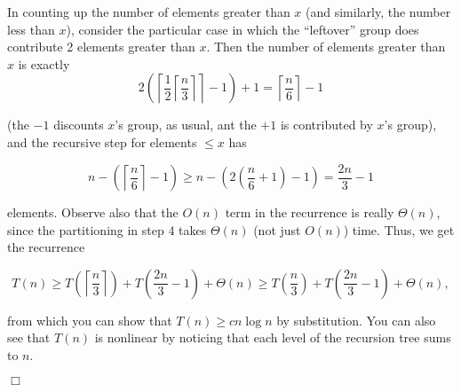 \documentclass[a4paper,10pt]{article}
\newcommand{\qed}{\hfill \ensuremath{\Box}}
\begin{document}
In counting up the number of elements greater than $x$ (and similarly, the number less than $x$), consider
the particular case in which the ``leftover'' group does contribute 2 elements greater than $x$. Then the
number of elements greater than $x$ is exactly
$$2\left(\left\lceil\frac{1}{2}\left\lceil\frac{n}{3}\right\rceil\right\rceil-1\right) + 1 
= \left\lceil\frac{n}{6}\right\rceil -1$$ 

(the $-1$ discounts $x$'s group, as usual, ant the $+1$ is contributed by $x$'s group), 
and the recursive step for elements $\leq x$ has

$$n -\left(\left\lceil\frac{n}{6}\right\rceil  -1\right) \geq n - \left(2\left(\frac{n}{6} + 1\right) - 1\right)
= \frac{2n}{3} - 1$$

 elements. Observe also that the $O(n)$ term in the recurrence is really $\Theta(n)$,
since the partitioning in step 4 takes $\Theta(n)$ (not just $O(n)$) time. Thus, we get the recurrence


$$T(n)\geq T\left(\left\lceil \frac{n}{3}  \right\rceil\right) + T\left(\frac{2n}{3} - 1\right) + \Theta(n)
\geq T\left(\frac{n}{3}\right) + T\left(\frac{2n}{3} - 1\right) + \Theta(n),$$


from which you can show that $T(n) \geq cn \log n$ by substitution. You can also see that $T(n)$ is 
nonlinear by noticing that each level of the recursion tree sums to $n$.

\qed
\end{document}
